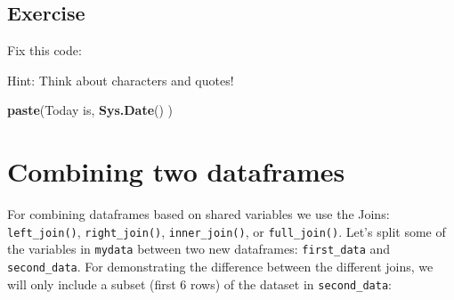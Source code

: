 \documentclass[]{book}
\makeatletter
\newenvironment{Shaded}{\begin{snugshade}}{\end{snugshade}}
\newcommand{\KeywordTok}[1]{\textcolor[rgb]{0.13,0.29,0.53}{\textbf{#1}}}
\newcommand{\DecValTok}[1]{\textcolor[rgb]{0.00,0.00,0.81}{#1}}
\newcommand{\StringTok}[1]{\textcolor[rgb]{0.31,0.60,0.02}{#1}}
\newcommand{\CommentTok}[1]{\textcolor[rgb]{0.56,0.35,0.01}{\textit{#1}}}
\newcommand{\OperatorTok}[1]{\textcolor[rgb]{0.81,0.36,0.00}{\textbf{#1}}}
\newcommand{\NormalTok}[1]{#1}
\newenvironment{kframe}{%
\medskip{}
\setlength{\fboxsep}{.8em}
 \def\at@end@of@kframe{}%
 \ifinner\ifhmode%
  \def\at@end@of@kframe{\end{minipage}}%
  \begin{minipage}{\columnwidth}%
 \fi\fi%
 \def\FrameCommand##1{\hskip\@totalleftmargin \hskip-\fboxsep
 \colorbox{shadecolor}{##1}\hskip-\fboxsep
     \hskip-\linewidth \hskip-\@totalleftmargin \hskip\columnwidth}%
 \MakeFramed {\advance\hsize-\width
   \@totalleftmargin\z@ \linewidth\hsize
   \@setminipage}}%
 {\par\unskip\endMakeFramed%
 \at@end@of@kframe}
\renewenvironment{Shaded}{\begin{kframe}}{\end{kframe}}
\theoremstyle{definition}
\theoremstyle{definition}
\theoremstyle{definition}
\theoremstyle{remark}
\makeatother
\begin{document}
\subsection{Exercise}\label{exercise-12}

Fix this code:

Hint: Think about characters and quotes!

\begin{Shaded}
\begin{Highlighting}[]
\KeywordTok{paste}\NormalTok{(Today is, }\KeywordTok{Sys.Date}\NormalTok{() )}
\end{Highlighting}
\end{Shaded}

\section{Combining two dataframes}\label{combining-two-dataframes}

For combining dataframes based on shared variables we use the Joins:
\texttt{left\_join()}, \texttt{right\_join()}, \texttt{inner\_join()},
or \texttt{full\_join()}. Let's split some of the variables in
\texttt{mydata} between two new dataframes: \texttt{first\_data} and
\texttt{second\_data}. For demonstrating the difference between the
different joins, we will only include a subset (first 6 rows) of the
dataset in \texttt{second\_data}:

\begin{Shaded}
\end{Shaded}
\end{document}

